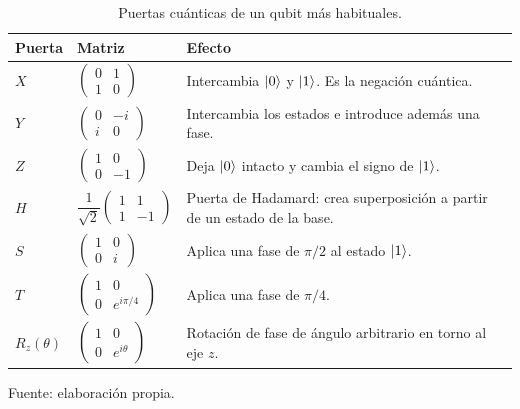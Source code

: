 \begin{table}[htbp]
    \centering
    \begin{tabular}{@{}llp{}@{}}
        \toprule
        \textbf{Puerta} & \textbf{Matriz} & \textbf{Efecto} \\
        \midrule
        $X$ & $\begin{pmatrix} 0 & 1 \\ 1 & 0\end{pmatrix}$
            & Intercambia $\ket{0}$ y $\ket{1}$. Es la negación cuántica. \\[1.1em]
        $Y$ & $\begin{pmatrix} 0 & -i \\ i & 0\end{pmatrix}$
            & Intercambia los estados e introduce además una fase. \\[1.1em]
        $Z$ & $\begin{pmatrix} 1 & 0 \\ 0 & -1\end{pmatrix}$
            & Deja $\ket{0}$ intacto y cambia el signo de $\ket{1}$. \\[1.1em]
        $H$ & $\dfrac{1}{\sqrt{2}}\begin{pmatrix} 1 & 1 \\ 1 & -1\end{pmatrix}$
            & Puerta de Hadamard: crea superposición a partir de un estado de la base. \\[1.1em]
        $S$ & $\begin{pmatrix} 1 & 0 \\ 0 & i\end{pmatrix}$
            & Aplica una fase de $\pi/2$ al estado $\ket{1}$. \\[1.1em]
        $T$ & $\begin{pmatrix} 1 & 0 \\ 0 & e^{i\pi/4}\end{pmatrix}$
            & Aplica una fase de $\pi/4$. \\[1.1em]
        $R_z(\theta)$ & $\begin{pmatrix} 1 & 0 \\ 0 & e^{i\theta}\end{pmatrix}$
            & Rotación de fase de ángulo arbitrario en torno al eje $z$. \\
        \bottomrule
    \end{tabular}

    \caption{Puertas cuánticas de un qubit más habituales.}
    \label{tab:puertas}

    {\footnotesize Fuente: elaboración propia.}
\end{table}

